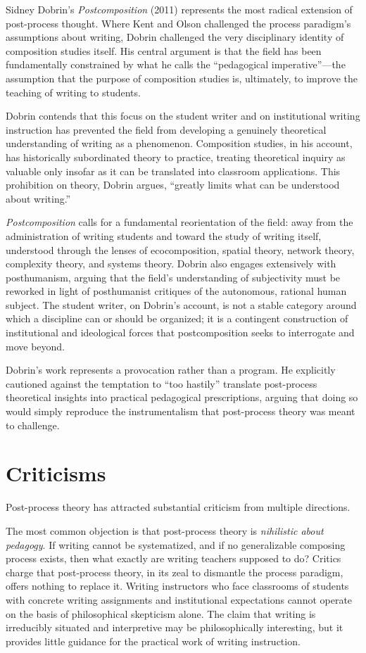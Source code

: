 \documentclass[12pt]{article}
\begin{document}
Sidney Dobrin's \textit{Postcomposition} (2011) represents the most radical extension of post-process thought. Where Kent and Olson challenged the process paradigm's assumptions about writing, Dobrin challenged the very disciplinary identity of composition studies itself. His central argument is that the field has been fundamentally constrained by what he calls the ``pedagogical imperative''---the assumption that the purpose of composition studies is, ultimately, to improve the teaching of writing to students.

Dobrin contends that this focus on the student writer and on institutional writing instruction has prevented the field from developing a genuinely theoretical understanding of writing as a phenomenon. Composition studies, in his account, has historically subordinated theory to practice, treating theoretical inquiry as valuable only insofar as it can be translated into classroom applications. This prohibition on theory, Dobrin argues, ``greatly limits what can be understood about writing.''

\textit{Postcomposition} calls for a fundamental reorientation of the field: away from the administration of writing students and toward the study of writing itself, understood through the lenses of ecocomposition, spatial theory, network theory, complexity theory, and systems theory. Dobrin also engages extensively with posthumanism, arguing that the field's understanding of subjectivity must be reworked in light of posthumanist critiques of the autonomous, rational human subject. The student writer, on Dobrin's account, is not a stable category around which a discipline can or should be organized; it is a contingent construction of institutional and ideological forces that postcomposition seeks to interrogate and move beyond.

Dobrin's work represents a provocation rather than a program. He explicitly cautioned against the temptation to ``too hastily'' translate post-process theoretical insights into practical pedagogical prescriptions, arguing that doing so would simply reproduce the instrumentalism that post-process theory was meant to challenge.

\section{Criticisms}

Post-process theory has attracted substantial criticism from multiple directions.

The most common objection is that post-process theory is \textit{nihilistic about pedagogy}. If writing cannot be systematized, and if no generalizable composing process exists, then what exactly are writing teachers supposed to do? Critics charge that post-process theory, in its zeal to dismantle the process paradigm, offers nothing to replace it. Writing instructors who face classrooms of students with concrete writing assignments and institutional expectations cannot operate on the basis of philosophical skepticism alone. The claim that writing is irreducibly situated and interpretive may be philosophically interesting, but it provides little guidance for the practical work of writing instruction.
\end{document}
